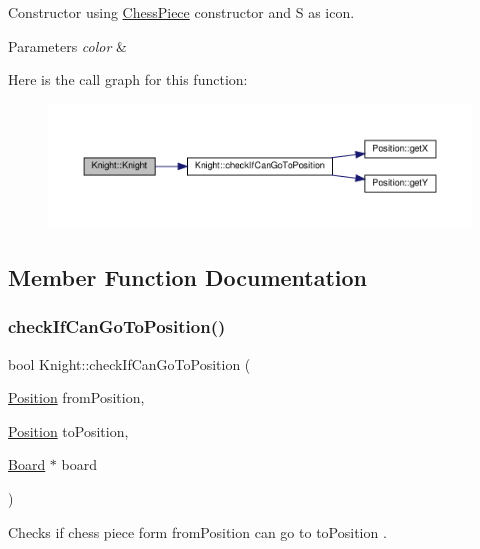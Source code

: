 Constructor using \hyperlink{classChessPiece}{Chess\+Piece} constructor and \textquotesingle{}S\textquotesingle{} as icon. 


\begin{DoxyParams}{Parameters}
{\em color} & \\
\hline
\end{DoxyParams}
Here is the call graph for this function\+:
\nopagebreak
\begin{figure}[H]
\begin{center}
\leavevmode
\includegraphics[width=350pt]{classKnight_ac26ef96049f2e732b0adbc829b66939d_cgraph}
\end{center}
\end{figure}


\subsection{Member Function Documentation}
\mbox{\label{classKnight_a8aaec0101a97586e884332bf15787319}} 
\subsubsection{\texorpdfstring{check\+If\+Can\+Go\+To\+Position()}{checkIfCanGoToPosition()}}
{\footnotesize\ttfamily bool Knight\+::check\+If\+Can\+Go\+To\+Position (\begin{DoxyParamCaption}\item[{\hyperlink{classPosition}{Position}}]{from\+Position,  }\item[{\hyperlink{classPosition}{Position}}]{to\+Position,  }\item[{\hyperlink{classBoard}{Board} $\ast$}]{board }\end{DoxyParamCaption})\hspace{0.3cm}{\ttfamily [virtual]}}



Checks if chess piece form from\+Position can go to to\+Position . 


